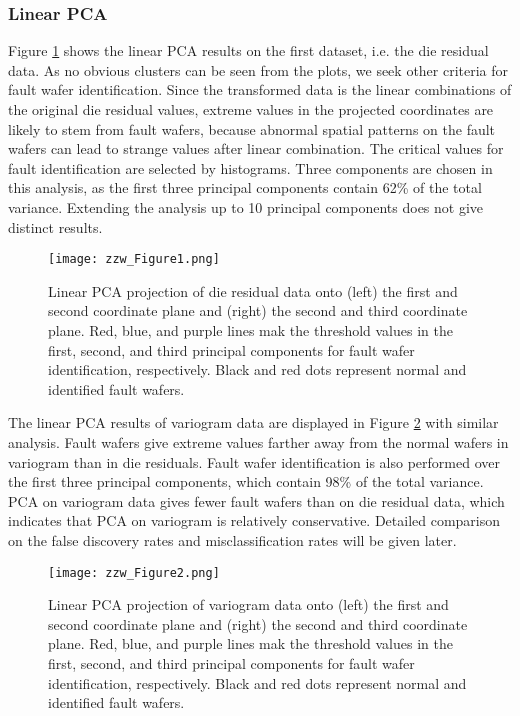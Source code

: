\documentclass[english]{article}
\numberwithin{equation}{section}
\numberwithin{table}{section}
\numberwithin{figure}{section}
\begin{document}
\subsubsection{Linear PCA}
\hspace{12 pt}
Figure \ref{fig:1} shows the linear PCA results on the first dataset,
i.e. the die residual data. As no obvious clusters can be seen from
the plots, we seek other criteria for fault wafer identification.
Since the transformed data is the linear combinations of the original
die residual values, extreme values in the projected coordinates are
likely to stem from fault wafers, because abnormal spatial patterns
on the fault wafers can lead to strange values after linear combination.
The critical values for fault identification are selected by histograms.
Three components are chosen in this analysis, as the first three principal
components contain 62\% of the total variance. Extending the analysis
up to 10 principal components does not give distinct results.

\begin{figure}[!tph]
\begin{centering}
\texttt{[image: zzw\_Figure1.png]}
\par\end{centering}

\caption{Linear PCA projection of die residual data onto (left) the first and
second coordinate plane and (right) the second and third coordinate
plane. Red, blue, and purple lines mak the threshold values in the
first, second, and third principal components for fault wafer identification,
respectively. Black and red dots represent normal and identified fault
wafers.\label{fig:1}}
\end{figure}


The linear PCA results of variogram data are displayed in Figure \ref{fig:2}
with similar analysis. Fault wafers give extreme values farther away
from the normal wafers in variogram than in die residuals. Fault wafer
identification is also performed over the first three principal components,
which contain 98\% of the total variance. PCA on variogram data gives
fewer fault wafers than on die residual data, which indicates that
PCA on variogram is relatively conservative. Detailed comparison on
the false discovery rates and misclassification rates will be given
later.

\begin{figure}[!tph]
\begin{centering}
\texttt{[image: zzw\_Figure2.png]}
\par\end{centering}

\caption{Linear PCA projection of variogram data onto (left) the first and
second coordinate plane and (right) the second and third coordinate
plane. Red, blue, and purple lines mak the threshold values in the
first, second, and third principal components for fault wafer identification,
respectively. Black and red dots represent normal and identified fault
wafers.\label{fig:2}}
\end{figure}
\end{document}
